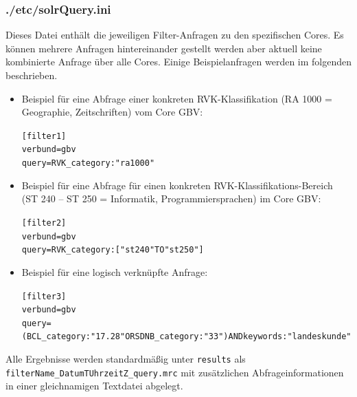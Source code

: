 \documentclass[10pt]{article}
\begin{document}
\subsubsection{./etc/solrQuery.ini}
Dieses Datei enthält die jeweiligen Filter-Anfragen zu den spezifischen Cores. Es können mehrere Anfragen hintereinander gestellt werden aber aktuell keine kombinierte Anfrage über alle Cores. Einige Beispielanfragen werden im folgenden beschrieben.
\begin{itemize}
	\item Beispiel für eine Abfrage einer konkreten RVK-Klassifikation (RA 1000 = Geographie, Zeitschriften) vom Core GBV:
		\begin{alltt}
			[filter1]
			verbund=gbv
			query=RVK_category:"ra 1000"
		\end{alltt}
	\item Beispiel für eine Abfrage für einen konkreten RVK-Klassifikations-Bereich (ST 240 – ST 250 = Informatik, Programmiersprachen) im Core GBV:
		\begin{alltt}
			[filter2]
			verbund=gbv
			query=RVK_category:["st 240" TO "st 250"]
		\end{alltt}
	\item Beispiel für eine logisch verknüpfte Anfrage: 
		\begin{alltt}
			[filter3]
			verbund=gbv
			query=(BCL_category:"17.28" OR SDNB_category:"33") AND 	keywords:"landeskunde"
		\end{alltt}
\end{itemize}
Alle Ergebnisse werden standardmäßig unter \texttt{results} als \texttt{filterName\_DatumTUhrzeitZ\_query.mrc} mit zusätzlichen Abfrageinformationen in einer gleichnamigen Textdatei abgelegt. 

\newpage
\end{document}

